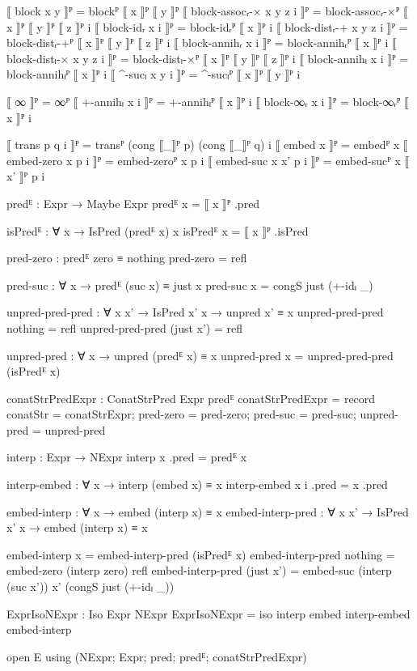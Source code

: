 \begin{code}[hide]
  ⟦ block x y ⟧ᴾ = blockᴾ ⟦ x ⟧ᴾ ⟦ y ⟧ᴾ
  ⟦ block-assocᵣ-× x y z i ⟧ᴾ = block-assocᵣ-×ᴾ ⟦ x ⟧ᴾ ⟦ y ⟧ᴾ ⟦ z ⟧ᴾ i
  ⟦ block-idᵣ x i ⟧ᴾ = block-idᵣᴾ ⟦ x ⟧ᴾ i
  ⟦ block-distᵣ-+ x y z i ⟧ᴾ = block-distᵣ-+ᴾ ⟦ x ⟧ᴾ ⟦ y ⟧ᴾ ⟦ z ⟧ᴾ i
  ⟦ block-annihᵣ x i ⟧ᴾ = block-annihᵣᴾ ⟦ x ⟧ᴾ i
  ⟦ block-distₗ-× x y z i ⟧ᴾ = block-distₗ-×ᴾ ⟦ x ⟧ᴾ ⟦ y ⟧ᴾ ⟦ z ⟧ᴾ i
  ⟦ block-annihₗ x i ⟧ᴾ = block-annihₗᴾ ⟦ x ⟧ᴾ i
  ⟦ ^-sucₗ x y i ⟧ᴾ = ^-sucₗᴾ ⟦ x ⟧ᴾ ⟦ y ⟧ᴾ i

  ⟦ ∞ ⟧ᴾ = ∞ᴾ
  ⟦ +-annihₗ x i ⟧ᴾ = +-annihₗᴾ ⟦ x ⟧ᴾ i
  ⟦ block-∞ᵣ x i ⟧ᴾ = block-∞ᵣᴾ ⟦ x ⟧ᴾ i

  ⟦ trans p q i ⟧ᴾ = transᴾ (cong ⟦_⟧ᴾ p) (cong ⟦_⟧ᴾ q) i
  ⟦ embed x ⟧ᴾ = embedᴾ x
  ⟦ embed-zero x p i ⟧ᴾ = embed-zeroᴾ x p i
  ⟦ embed-suc x x' p i ⟧ᴾ = embed-sucᴾ x ⟦ x' ⟧ᴾ p i

  predᴱ : Expr → Maybe Expr
  predᴱ x = ⟦ x ⟧ᴾ .pred

  isPredᴱ : ∀ x → IsPred (predᴱ x) x
  isPredᴱ x = ⟦ x ⟧ᴾ .isPred

  pred-zero : predᴱ zero ≡ nothing
  pred-zero = refl

  pred-suc : ∀ x → predᴱ (suc x) ≡ just x
  pred-suc x = congS just (+-idₗ _)

  unpred-pred-pred : ∀ {x x'} → IsPred x' x → unpred x' ≡ x
  unpred-pred-pred nothing = refl
  unpred-pred-pred (just x') = refl

  unpred-pred : ∀ x → unpred (predᴱ x) ≡ x
  unpred-pred x = unpred-pred-pred (isPredᴱ x)

  conatStrPredExpr : ConatStrPred Expr predᴱ
  conatStrPredExpr =
    record
      { conatStr = conatStrExpr;
        pred-zero = pred-zero;
        pred-suc = pred-suc;
        unpred-pred = unpred-pred }

  interp : Expr → NExpr
  interp x .pred = predᴱ x

  interp-embed : ∀ x → interp (embed x) ≡ x
  interp-embed x i .pred = x .pred

  embed-interp : ∀ x → embed (interp x) ≡ x
  embed-interp-pred : ∀ {x x'} → IsPred x' x → embed (interp x) ≡ x

  embed-interp x = embed-interp-pred (isPredᴱ x)
  embed-interp-pred nothing = embed-zero (interp zero) refl
  embed-interp-pred (just x') =
    embed-suc (interp (suc x')) x' (congS just (+-idₗ _))

  ExprIsoNExpr : Iso Expr NExpr
  ExprIsoNExpr = iso interp embed interp-embed embed-interp

open E using (NExpr; Expr; pred; predᴱ; conatStrPredExpr)


\end{code}
